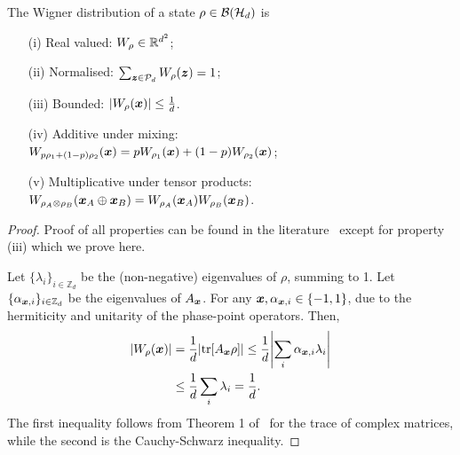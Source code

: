 \begin{proposition}\label{thm:wstate}
  The Wigner distribution of a state $\rho \in \cal{B}(\cal{H}_d)$ is
  \begin{enumerate}
    \item[(i)]\label{en:w1} Real valued: $\W{\rho} \in \mathbb{R}^{d^2}$;
    \item[(ii)]\label{en:w2} Normalised: $\sum_{\bmz \in \cal{P}_d} \W[\bmz]{\rho}=1$;
    \item[(iii)]\label{en:w3} Bounded: $\abs{\W[\bmx]{\rho}} \leq \frac{1}{d}$.
    \item[(iv)]\label{en:w4} Additive under mixing: \vspace{2pt}\\
    $\W[\bmx]{p\rho_1 + (1-p)\rho_2} = p\W[\bmx]{\rho_1} + (1-p)\W[\bmx]{\rho_2}$;
    \item[(v)]\label{en:w5} Multiplicative under tensor products: \vspace{2pt}\\
    $\W[\bmx_A \oplus \bmx_B]{\rho_A \otimes \rho_B} = \W[\bmx_A]{\rho_A}\W[\bmx_B]{\rho_B}$.
	\end{enumerate}
\end{proposition}
\begin{proof}
	Proof of all properties can be found in the literature~\cite{cit:veitch,Vourdas_2004,cit:gross3,Wang_2019} except for property (iii) which we prove here.
	
Let $\{\lambda_i\}_{i \in \mathbb{Z}_d}$ be the (non-negative) eigenvalues of $\rho$, summing to 1.
Let $\{\alpha_{\bmx,i}\}_{i \in \mathbb{Z}_d}$ be the eigenvalues of $A_{\bmx}$. For any $\bmx, \alpha_{\bmx,i} \in \{-1, 1\}$, due to the hermiticity and unitarity of the phase-point operators. 
Then,
\begin{align}
	\abs{W_{\rho}(\bmx)} &= \frac{1}{d}\abs{\tr[A_{\bmx} \rho]} \leq \frac{1}{d} \abs{\sum_i \alpha_{\bmx,i} \lambda_i} \nonumber\\ &\leq \frac{1}{d}\sum_i \lambda_i = \frac{1}{d}.
\end{align}
The first inequality follows from Theorem 1 of~\cite{cit:mirsky} for the trace of complex matrices, while the second is the Cauchy-Schwarz inequality.
\end{proof}

